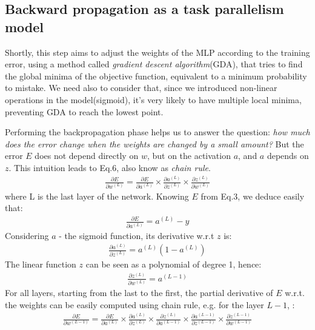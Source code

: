 \documentclass{article}
\begin{document}
\subsection{Backward propagation as a task parallelism model}

Shortly, this step aims to adjust the weights of the MLP according to the training error, using a method called \textit{gradient descent algorithm}(GDA), that tries to find the global minima of the objective function, equivalent to a minimum probability to mistake.
We need also to consider that, since we introduced non-linear operations in the model(sigmoid), it's very likely to have multiple local minima, preventing GDA to reach the lowest point.

Performing the backpropagation phase helps us to answer the question: \textit{how much does the error change when the weights are changed by a small amount?} But the error $E$ does not depend directly on $w$, but on the activation $a$, and $a$ depends on $z$. This intuition leads to Eq.6, also know as \textit{chain rule}.
\begin{eqnarray}
	\frac{\partial E}{\partial w^{(L)}} = \frac{\partial E}{\partial a^{(L)}} \times \frac{\partial a^{(L)}}{\partial z^{(L)}} \times \frac{\partial z^{(L)}}{\partial w^{(L)}}
\end{eqnarray}
where L is the last layer of the network. Knowing $E$ from Eq.3, we deduce easily that:
\begin{eqnarray}
	\frac{\partial E}{\partial a^{(L)}} = a^{(L)} - y
\end{eqnarray}
Considering $a$ - the sigmoid function, its derivative w.r.t $z$ is:
\begin{eqnarray}
	\frac{\partial a^{(L)}}{\partial z^{(L)}} = a^{(L)}(1 - a^{(L)})
\end{eqnarray}
The linear function $z$ can be seen as a polynomial of degree 1, hence:
\begin{eqnarray}
	\frac{\partial z^{(L)}}{\partial w^{(L)}} = a^{(L-1)}
\end{eqnarray}
For all layers, starting from the last to the first, the partial derivative of $E$ w.r.t. the weights can be easily computed using chain rule, e.g. for the layer $L-1$, :
\begin{eqnarray}
	\frac{\partial E}{\partial w^{(L-1)}} = \frac{\partial E}{\partial a^{(L)}} \times 
	\frac{\partial a^{(L)}}{\partial z^{(L)}} \times 
	\frac{\partial z^{(L)}}{\partial a^{(L-1)}} \times
	\frac{\partial a^{(L-1)}}{\partial z^{(L-1)}} \times 
	\frac{\partial z^{(L-1)}}{\partial w^{(L-1)}}
\end{eqnarray}
\end{document}
